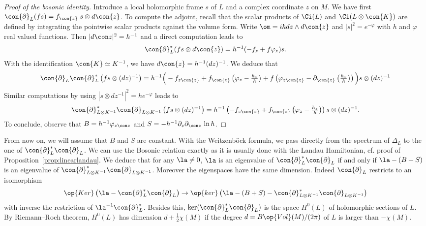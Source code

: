 \begin{proof}[Proof of the bosonic identity]
Introduce a local holomorphic frame $s$ of $L$ and a complex coordinate $z$ on $M$. We have first $\con{\partial}_L (f s) = f_{\con{z}} \; s \otimes d \con{z}$. To compute the adjoint, recall that the scalar products of $\Ci (L)$ and $\Ci(L \otimes \con{K})$ are defined by integrating the pointwise scalar products against the volume form. Write $\om = i h dz \wedge d \con{z}$ and $|s|^2 = e^{-
\varphi}$ with $h$ and $\varphi$ real valued functions. Then $|d \con z |^2 = h^{-1}$ and a direct computation leads to
\[
\con{\partial}_L^* (f s \otimes d\con{z}) = h^{-1} (-
f_z + f \varphi_z) s.
\]
With the identification $\con{K} \simeq K^{-1}$, we have $ d\con{z} = h^{-1} (dz)^{-1}$. We deduce that
\[
\con{\partial}_L \con {\partial}_L^* \left(f s \otimes (dz)^{-1}\right) = h^{-1} \Big(-
f_{z \con{z} } + f_{\con{z}} \left(\varphi_z - \tfrac{h_z}{h}\right) + f \left(\varphi_{z
\con{z}} - \partial_{\con{z}} \left(\tfrac{h_z}{h}\right)\right) \Big) s \otimes (dz)^{-1}
\]
Similar computations by using $|s \otimes dz^{-1} |^2 = h e^{-\varphi}$ leads to
\[
\con{\partial}_{L\otimes
K^{-1}} ^* \con{\partial}_{L\otimes K^{-1}} \left(f s \otimes (dz)^{-1}\right) = h^{-1} \left(- f_{z \con{z}} +
f_{\con{z}} \left(\varphi_z - \tfrac{h_z}{h}\right) \right) s \otimes (dz)^{-1}.
\]
To conclude, observe that $B = h^{-1} \varphi_{z \con z}$ and $S = - h^{-1}
\partial_z \partial_{\con z} \, \ln h $.
\end{proof}

From now on, we will assume that $B$ and $S$ are constant. With the Weitzenb\"ock formula, we pass directly from the spectrum of $\Delta _L$ to the one of $\con{\partial}^*_L \con{\partial}_L$. We can use the Bosonic relation exactly as it is usually done with the Landau Hamiltonian, cf. proof of Proposition~\ref{prop:linearlandau}. We deduce that for any $\la \neq 0$, $\la $ is an eigenvalue of $\con{\partial}^*_L
\con{\partial}_L$ if and only if $\la - (B+S)$ is an eigenvalue of $\con{\partial}^*_{L\otimes K^{-1}} \con{\partial}_{L\otimes K^{-1}}$. Moreover the eigenspaces have the same dimension. Indeed $\con{\partial}_L$ restricts to an isomorphism
\[
\op{Ker} \left(\la - \con{\partial}^*_L
\con{\partial}_L\right) \rightarrow \op{ker} \left(\la - (B+S) -
\con{\partial}^*_{L\otimes K^{-1}} \con{\partial}_{L\otimes K^{-1}}\right)
\]
with inverse the restriction of $\la^{-1} \con {\partial}_L^*$. Besides this, $\ker (\con{\partial}^*_L
\con{\partial}_L)$ is the space $H^0 (L)$ of holomorphic sections of $L$. By Riemann--Roch theorem, $H^0 (L)$ has dimension $d + \frac{1}{2} \chi (M)$ if the degree $d = B \op{Vol}(M)/(2\pi)$ of $L$ is larger than $- \chi (M)$.

